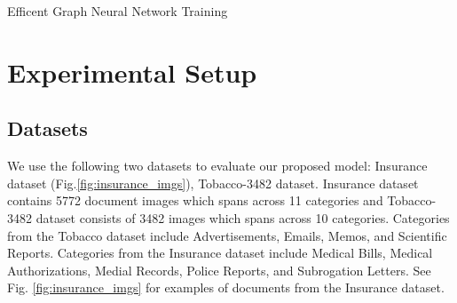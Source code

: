 \documentclass[letterpaper]{article}
\begin{document}
 \begin{algorithm}[h!]
 \caption{Efficent Graph Neural Network Training}
        \DontPrintSemicolon
\label{psuedocode}
    \end{algorithm}
    

 \section{Experimental Setup}
\subsection{Datasets} 
We use the following two datasets to evaluate our proposed model: Insurance dataset (Fig.\ref{fig:insurance_imgs}), Tobacco-3482 dataset\cite{kumar2014structural}. Insurance dataset contains 5772 document images which spans across 11 categories and Tobacco-3482 dataset consists of 3482 images which spans across 10 categories. Categories from the Tobacco dataset include Advertisements, Emails, Memos, and Scientific Reports. Categories from the Insurance dataset include Medical Bills, Medical Authorizations, Medial Records, Police Reports, and Subrogation Letters. See Fig. \ref{fig:insurance_imgs} for examples of documents from the Insurance dataset.
\end{document}
